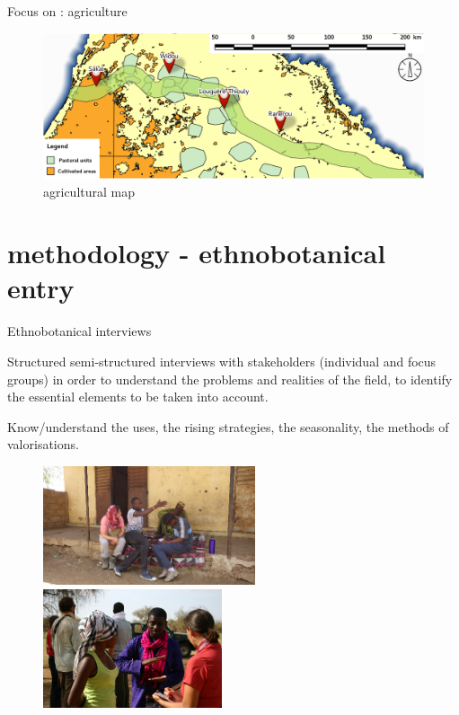 \documentclass[newPxFont]{beamer}
\begin{document}
\begin{frame}[c]{Focus on : agriculture}
\vspace{-1cm}
\begin{figure}
	\centering
	\includegraphics[width = \textwidth]{img/agriculture_map.png}
	\caption{agricultural map}
\end{figure}
\end{frame}

\section{methodology - ethnobotanical entry}

\begin{frame}[c]{Ethnobotanical interviews}
\vspace{-1cm}

Structured semi-structured interviews with stakeholders (individual and focus groups) in order to understand the problems and realities of the field, to identify the essential elements to be taken into account.

Know/understand the uses, the rising strategies, the seasonality, the methods of valorisations.


\begin{figure}
	\hspace{-1.5em}
	\includegraphics[height = 3.5cm]{img/group3.png}~
  \includegraphics[height = 3.5cm]{img/group2.png}
\end{figure}
\end{frame}
\end{document}
